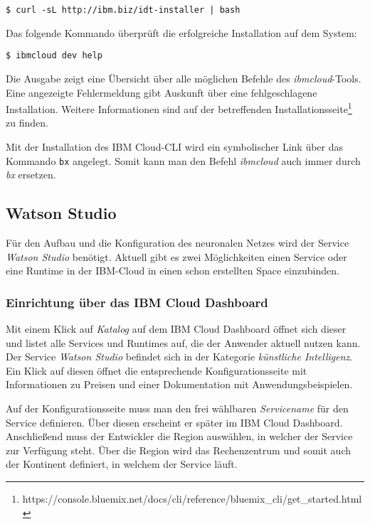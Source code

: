 \begin{lstlisting}[caption=Installation des IBM Cloud CLI, label=ls:vorbereitung_ibmcli]
    $ curl -sL http://ibm.biz/idt-installer | bash
\end{lstlisting}

Das folgende Kommando überprüft die erfolgreiche Installation auf dem System:

\begin{lstlisting}[caption=Installation des CLI überprüfen, label=ls:vorbereitung_ibmclitest]
    $ ibmcloud dev help
\end{lstlisting}

Die Ausgabe zeigt eine Übersicht über alle möglichen Befehle des \textit{ibmcloud}-Tools. Eine angezeigte Fehlermeldung
gibt Auskunft über eine fehlgeschlagene Installation. Weitere Informationen sind auf der betreffenden
Installationsseite\footnote{https://console.bluemix.net/docs/cli/reference/bluemix\_cli/get\_started.html} zu finden.

Mit der Installation des IBM Cloud-CLI wird ein symbolischer Link über das Kommando \texttt{bx} angelegt. Somit kann man
den Befehl \textit{ibmcloud} auch immer durch \textit{bx} ersetzen.

\subsection{Watson Studio}
Für den Aufbau und die Konfiguration des neuronalen Netzes wird der Service \textit{Watson Studio} benötigt. Aktuell gibt
es zwei Möglichkeiten einen Service oder eine Runtime in der IBM-Cloud in einen schon erstellten Space einzubinden.

\subsubsection{Einrichtung über das IBM Cloud Dashboard}
Mit einem Klick auf \textit{Katalog} auf dem IBM Cloud Dashboard öffnet sich dieser und listet alle Services und Runtimes
auf, die der Anwender aktuell nutzen kann. Der Service \textit{Watson Studio} befindet sich in der Kategorie
\textit{künstliche Intelligenz}. Ein Klick auf diesen öffnet die entsprechende Konfigurationsseite mit Informationen zu
Preisen und einer Dokumentation mit Anwendungsbeispielen.

Auf der Konfigurationsseite muss man den frei wählbaren \textit{Servicename} für den Service definieren. Über diesen
erscheint er später im IBM Cloud Dashboard. Anschließend muss der Entwickler die Region auswählen, in welcher der Service
zur Verfügung steht. Über die Region wird das Rechenzentrum und somit auch der Kontinent definiert, in welchem der Service
läuft.

